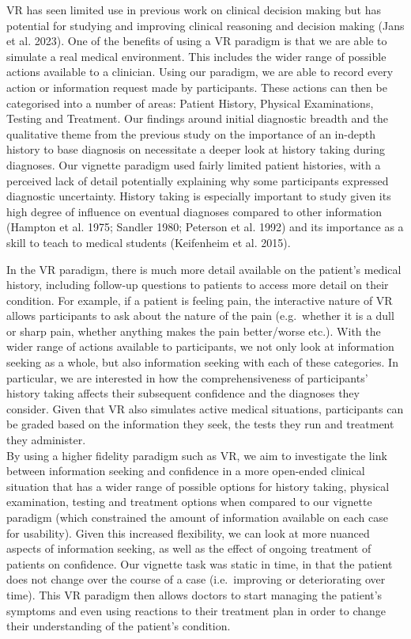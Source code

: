 \documentclass[a4paper, nobind]{templates/ociamthesis}
\begin{document}
\hfill\break
VR has seen limited use in previous work on clinical decision making but has potential for studying and improving clinical reasoning and decision making (Jans et al. 2023). One of the benefits of using a VR paradigm is that we are able to simulate a real medical environment. This includes the wider range of possible actions available to a clinician. Using our paradigm, we are able to record every action or information request made by participants. These actions can then be categorised into a number of areas: Patient History, Physical Examinations, Testing and Treatment. Our findings around initial diagnostic breadth and the qualitative theme from the previous study on the importance of an in-depth history to base diagnosis on necessitate a deeper look at history taking during diagnoses. Our vignette paradigm used fairly limited patient histories, with a perceived lack of detail potentially explaining why some participants expressed diagnostic uncertainty. History taking is especially important to study given its high degree of influence on eventual diagnoses compared to other information (Hampton et al. 1975; Sandler 1980; Peterson et al. 1992) and its importance as a skill to teach to medical students (Keifenheim et al. 2015).

\hfill\break
In the VR paradigm, there is much more detail available on the patient's medical history, including follow-up questions to patients to access more detail on their condition. For example, if a patient is feeling pain, the interactive nature of VR allows participants to ask about the nature of the pain (e.g.~whether it is a dull or sharp pain, whether anything makes the pain better/worse etc.). With the wider range of actions available to participants, we not only look at information seeking as a whole, but also information seeking with each of these categories. In particular, we are interested in how the comprehensiveness of participants' history taking affects their subsequent confidence and the diagnoses they consider. Given that VR also simulates active medical situations, participants can be graded based on the information they seek, the tests they run and treatment they administer.\\

By using a higher fidelity paradigm such as VR, we aim to investigate the link between information seeking and confidence in a more open-ended clinical situation that has a wider range of possible options for history taking, physical examination, testing and treatment options when compared to our vignette paradigm (which constrained the amount of information available on each case for usability). Given this increased flexibility, we can look at more nuanced aspects of information seeking, as well as the effect of ongoing treatment of patients on confidence. Our vignette task was static in time, in that the patient does not change over the course of a case (i.e.~improving or deteriorating over time). This VR paradigm then allows doctors to start managing the patient's symptoms and even using reactions to their treatment plan in order to change their understanding of the patient's condition.
\end{document}
